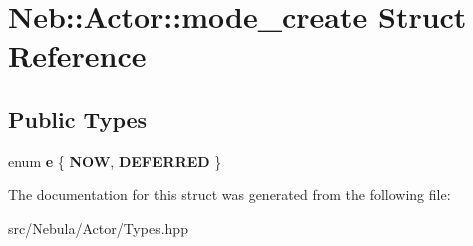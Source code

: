 \hypertarget{structNeb_1_1Actor_1_1mode__create}{\section{\-Neb\-:\-:\-Actor\-:\-:mode\-\_\-create \-Struct \-Reference}
\label{structNeb_1_1Actor_1_1mode__create}
}
\subsection*{\-Public \-Types}
\begin{DoxyCompactItemize}
\item 
enum {\bfseries e} \{ {\bfseries \-N\-O\-W}, 
{\bfseries \-D\-E\-F\-E\-R\-R\-E\-D}
 \}
\end{DoxyCompactItemize}


\-The documentation for this struct was generated from the following file\-:\begin{DoxyCompactItemize}
\item 
src/\-Nebula/\-Actor/\-Types.\-hpp\end{DoxyCompactItemize}
